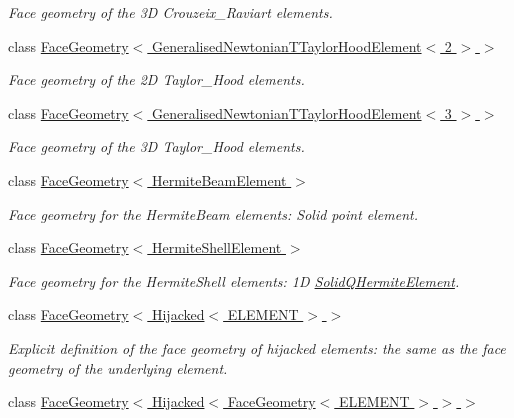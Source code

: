 \begin{DoxyCompactItemize}
\begin{DoxyCompactList}\small\item\em Face geometry of the 3D Crouzeix\+\_\+\+Raviart elements. \end{DoxyCompactList}\item 
class \hyperlink{classoomph_1_1FaceGeometry_3_01GeneralisedNewtonianTTaylorHoodElement_3_012_01_4_01_4}{Face\+Geometry$<$ Generalised\+Newtonian\+T\+Taylor\+Hood\+Element$<$ 2 $>$ $>$}
\begin{DoxyCompactList}\small\item\em Face geometry of the 2D Taylor\+\_\+\+Hood elements. \end{DoxyCompactList}\item 
class \hyperlink{classoomph_1_1FaceGeometry_3_01GeneralisedNewtonianTTaylorHoodElement_3_013_01_4_01_4}{Face\+Geometry$<$ Generalised\+Newtonian\+T\+Taylor\+Hood\+Element$<$ 3 $>$ $>$}
\begin{DoxyCompactList}\small\item\em Face geometry of the 3D Taylor\+\_\+\+Hood elements. \end{DoxyCompactList}\item 
class \hyperlink{classoomph_1_1FaceGeometry_3_01HermiteBeamElement_01_4}{Face\+Geometry$<$ Hermite\+Beam\+Element $>$}
\begin{DoxyCompactList}\small\item\em Face geometry for the Hermite\+Beam elements\+: Solid point element. \end{DoxyCompactList}\item 
class \hyperlink{classoomph_1_1FaceGeometry_3_01HermiteShellElement_01_4}{Face\+Geometry$<$ Hermite\+Shell\+Element $>$}
\begin{DoxyCompactList}\small\item\em Face geometry for the Hermite\+Shell elements\+: 1D \hyperlink{classoomph_1_1SolidQHermiteElement}{Solid\+Q\+Hermite\+Element}. \end{DoxyCompactList}\item 
class \hyperlink{classoomph_1_1FaceGeometry_3_01Hijacked_3_01ELEMENT_01_4_01_4}{Face\+Geometry$<$ Hijacked$<$ E\+L\+E\+M\+E\+N\+T $>$ $>$}
\begin{DoxyCompactList}\small\item\em Explicit definition of the face geometry of hijacked elements\+: the same as the face geometry of the underlying element. \end{DoxyCompactList}\item 
class \hyperlink{classoomph_1_1FaceGeometry_3_01Hijacked_3_01FaceGeometry_3_01ELEMENT_01_4_01_4_01_4}{Face\+Geometry$<$ Hijacked$<$ Face\+Geometry$<$ E\+L\+E\+M\+E\+N\+T $>$ $>$ $>$}

\end{DoxyCompactItemize}
